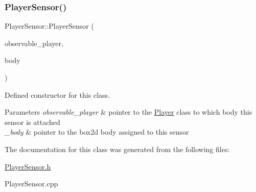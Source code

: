 \subsubsection{\texorpdfstring{Player\+Sensor()}{PlayerSensor()}}
{\footnotesize\ttfamily Player\+Sensor\+::\+Player\+Sensor (\begin{DoxyParamCaption}\item[{\hyperlink{class_player}{Player} $\ast$}]{observable\+\_\+player,  }\item[{b2\+Body $\ast$}]{body }\end{DoxyParamCaption})}



Defined constructor for this class. 


\begin{DoxyParams}{Parameters}
{\em observable\+\_\+player} & pointer to the \hyperlink{class_player}{Player} class to which body this sensor is attached \\
\hline
{\em \+\_\+body} & pointer to the box2d body assigned to this sensor \\
\hline
\end{DoxyParams}


The documentation for this class was generated from the following files\+:\begin{DoxyCompactItemize}
\item 
\hyperlink{_player_sensor_8h}{Player\+Sensor.\+h}\item 
Player\+Sensor.\+cpp\end{DoxyCompactItemize}
